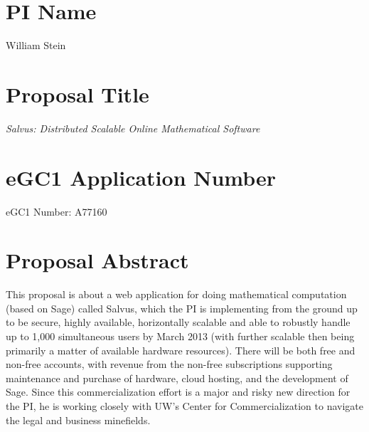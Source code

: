 \documentclass[11pt]{article}
\begin{document}
\mbox{}\vspace{4ex}

\section*{PI Name} 
William Stein

\vspace{3ex}
\section*{Proposal Title} 
{\em Salvus: Distributed Scalable Online Mathematical Software}

\vspace{3ex}

\section*{eGC1 Application Number} 
eGC1 Number: A77160

\vspace{3ex}

\section*{Proposal Abstract} 
This proposal is about a web application for doing mathematical
computation (based on Sage) called Salvus, which the PI is
implementing from the ground up to be secure, highly available,
horizontally scalable and able to robustly handle up to 1,000
simultaneous users by March 2013 (with further scalable then being
primarily a matter of available hardware resources).  There will be
both free and non-free accounts, with revenue from the non-free
subscriptions supporting maintenance and purchase of hardware, cloud
hosting, and the development of Sage.  Since this commercialization
effort is a major and risky new direction for the PI, he is working
closely with UW's Center for Commercialization to navigate the legal
and business minefields.

\vspace{3ex}
\end{document}
